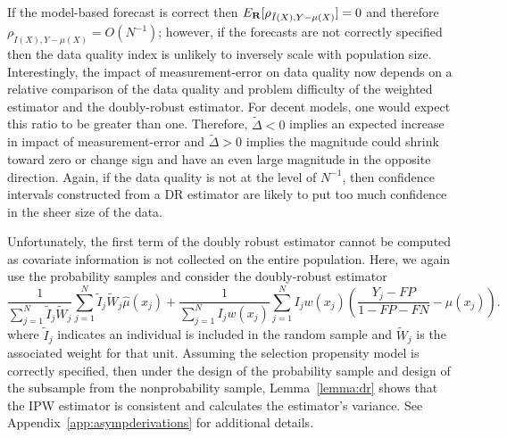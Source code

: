 \documentclass[11pt]{amsart}
\numberwithin{equation}{section}
\theoremstyle{plain}
\begin{document}
If the model-based forecast is correct then $E_{\bf R} [ \rho_{\tilde I (X), Y-\mu(X)} ] = 0$  and therefore $\rho_{\tilde I(X), Y-\mu(X)} = O(N^{-1})$; however, if the forecasts are not correctly specified then the data quality index is unlikely to inversely scale with population size. Interestingly, the impact of measurement-error on data quality now depends on a relative comparison of the data quality and problem difficulty of the weighted estimator and the doubly-robust estimator.  For decent models, one would expect this ratio to be greater than one.  Therefore, $\tilde \Delta < 0$ implies an expected increase in impact of measurement-error and $\tilde \Delta > 0$ implies the magnitude could shrink toward zero or change sign and have an even large magnitude in the opposite direction.  Again, if the data quality is not at the level of $N^{-1}$, then confidence intervals constructed from a DR estimator are likely to put too much confidence in the sheer size of the data.

Unfortunately, the first term of the doubly robust estimator cannot be computed as covariate information is not collected on the entire population.  Here, we again use the probability samples and consider the doubly-robust estimator
$$
\frac{1}{\sum_{j=1}^N \tilde I_j \tilde W_j} \sum_{j=1}^N  \tilde I_j \tilde W_j \hat \mu (x_j) + \frac{1}{\sum_{j=1}^N I_j w (x_j)} \sum_{j=1}^N I_j w(x_j) \left( \frac{Y_j - FP}{1 - FP - FN} - \mu(x_j) \right).
$$
where $\tilde I_j$ indicates an individual is included in the random sample and $\tilde W_j$ is the associated weight for that unit. Assuming the selection propensity model is correctly specified, then under the design of the probability sample and design of the subsample from the nonprobability sample, Lemma~\ref{lemma:dr} shows that the IPW estimator is  consistent and calculates the estimator's variance. See Appendix~\ref{app:asympderivations} for additional details.
\end{document}
